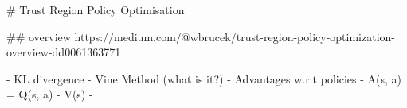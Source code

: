 # Trust Region Policy Optimisation

## overview
https://medium.com/@wbrucek/trust-region-policy-optimization-overview-dd0061363771

- KL divergence
- Vine Method (what is it?)
- Advantages w.r.t policies
  - A(s, a) = Q(s, a) - V(s)
  - 